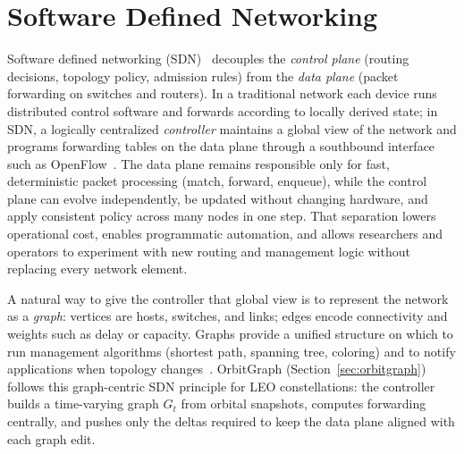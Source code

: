 
\section{Software Defined Networking}
\label{sec:sdn}

Software defined networking (SDN)~\cite{10.1145/1355734.1355746} decouples the
\emph{control plane} (routing decisions, topology policy, admission rules) from
the \emph{data plane} (packet forwarding on switches and routers).
In a traditional network each device runs distributed control software and
forwards according to locally derived state; in SDN, a logically centralized
\emph{controller} maintains a global view of the network and programs
forwarding tables on the data plane through a southbound interface such as
OpenFlow~\cite{10.1145/1355734.1355746}.
The data plane remains responsible only for fast, deterministic packet
processing (match, forward, enqueue), while the control plane can evolve
independently, be updated without changing hardware, and apply consistent
policy across many nodes in one step.
That separation lowers operational cost, enables programmatic automation, and
allows researchers and operators to experiment with new routing and management
logic without replacing every network element.

A natural way to give the controller that global view is to represent the
network as a \emph{graph}: vertices are hosts, switches, and links; edges
encode connectivity and weights such as delay or capacity.
Graphs provide a unified structure on which to run management algorithms
(shortest path, spanning tree, coloring) and to notify applications when
topology changes~\cite{7014202}.
OrbitGraph (Section~\ref{sec:orbitgraph}) follows this graph-centric SDN
principle for LEO constellations: the controller builds a time-varying graph
$G_t$ from orbital snapshots, computes forwarding centrally, and pushes only
the deltas required to keep the data plane aligned with each graph edit.
